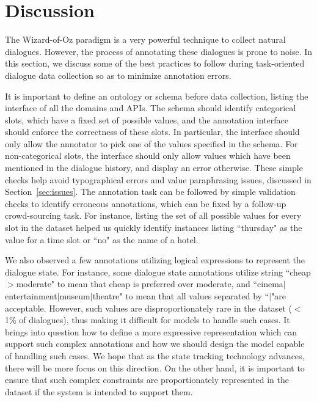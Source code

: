 \section{Discussion}

The Wizard-of-Oz paradigm is a very powerful technique to collect natural dialogues. However, the process of annotating these dialogues is prone to noise. In this section, we discuss some of the best practices to follow during task-oriented dialogue data collection so as to minimize annotation errors.

It is important to define an ontology or schema before data collection, listing the interface of all the domains and APIs. The schema should identify categorical slots, which have a fixed set of possible values, and the annotation interface should enforce the correctness of these slots. In particular, the interface should only allow the annotator to pick one of the values specified in the schema. For non-categorical slots, the interface should only allow values which have been mentioned in the dialogue history, and display an error otherwise. These simple checks help avoid typographical errors and value paraphrasing issues, discussed in Section~\ref{sec:issues}. The annotation task can be followed by simple validation checks to identify erroneous annotations, which can be fixed by a follow-up crowd-sourcing task. For instance, listing the set of all possible values for every slot in the dataset helped us quickly identify instances listing ``thursday" as the value for a time slot or ``no" as the name of a hotel.

We also observed a few annotations utilizing logical expressions to represent the dialogue state. For instance, some dialogue state annotations utilize string ``cheap$>$moderate" to mean that cheap is preferred over moderate, and ``cinema$|$entertainment$|$museum$|$theatre" to mean that all values separated by ``$|$"are acceptable. However, such values are disproportionately rare in the dataset ($<$1\% of dialogues), thus making it difficult for models to handle such cases. It brings into question how to define a more expressive representation which can support such complex annotations and how we should design the model capable of handling such cases. We hope that as the state tracking technology advances, there will be more focus on this direction. On the other hand, it is important to ensure that such complex constraints are proportionately represented in the dataset if the system is intended to support them.

